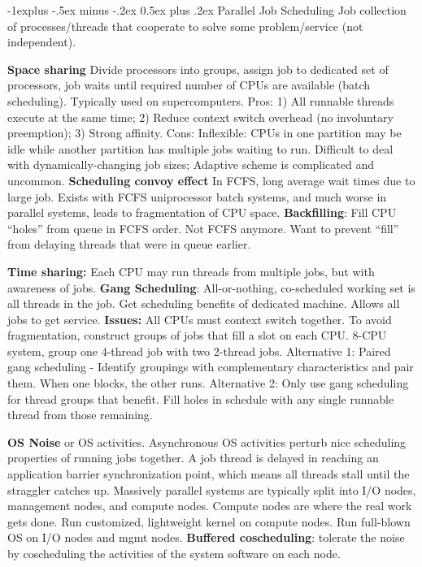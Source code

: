 \documentclass[6pt,landscape]{article}
\makeatletter
\renewcommand{\subsection}{\@startsection{subsection}{2}{0mm}%
                                {-1explus -.5ex minus -.2ex}%
                                {0.5ex plus .2ex}%
                                {\normalfont\normalsize\bfseries}}
\makeatother
\begin{document}
\footnotesize
\begin{multicols}{3}


\setlength{\premulticols}{1pt}
\setlength{\postmulticols}{1pt}
\setlength{\multicolsep}{1pt}
\setlength{\columnsep}{2pt}

\subsection{Parallel Job Scheduling}
Job collection of processes/threads that cooperate to solve some problem/service (not independent).

{\bf Space sharing} Divide processors into groups, assign job to dedicated set of processors, job waits until required number of CPUs are available (batch scheduling). Typically used on supercomputers.
Pros: 1) All runnable threads execute at the same time; 2) Reduce context switch overhead (no involuntary preemption); 3) Strong affinity. 
Cons: Inflexible: CPUs in one partition may be idle while another partition has multiple jobs waiting to run. Difficult to deal with dynamically-changing job sizes; Adaptive scheme is complicated and uncommon.
{\bf Scheduling convoy effect} In FCFS, long average wait times due to large job. Exists with FCFS uniprocessor batch systems, and much worse in parallel systems, leads to fragmentation of CPU space.
{\bf Backfilling}: Fill CPU “holes” from queue in FCFS order. Not FCFS anymore. Want to prevent ``fill'' from delaying threads that were in queue earlier.

{\bf Time sharing:} Each CPU may run threads from multiple jobs, but with awareness of jobs.
{\bf Gang Scheduling}: All-or-nothing, co-scheduled working set is all threads in the job. Get scheduling benefits of dedicated machine. Allows all jobs to get service. {\bf Issues:} All CPUs must context switch together. To avoid fragmentation, construct groups of jobs that fill a slot on each CPU. 8-CPU system, group one 4-thread job with two 2-thread jobs. Alternative 1: Paired gang scheduling - Identify groupings with complementary characteristics and pair them. When one blocks, the other runs. Alternative 2: Only use gang scheduling for thread groups that benefit. Fill holes in schedule with any single runnable thread from those remaining.

{\bf OS Noise} or OS activities. Asynchronous OS activities perturb nice scheduling properties of running jobs together. A job thread is delayed in reaching an application barrier synchronization point, which means all threads stall until the straggler catches up. Massively parallel systems are typically split into I/O nodes, management nodes, and compute nodes. Compute nodes are where the real work gets done. Run customized, lightweight kernel on compute nodes. Run full-blown OS on I/O nodes and mgmt nodes. {\bf Buffered coscheduling}: tolerate the noise by coscheduling the activities of the system software on each node.


\end{multicols}
\end{document}
